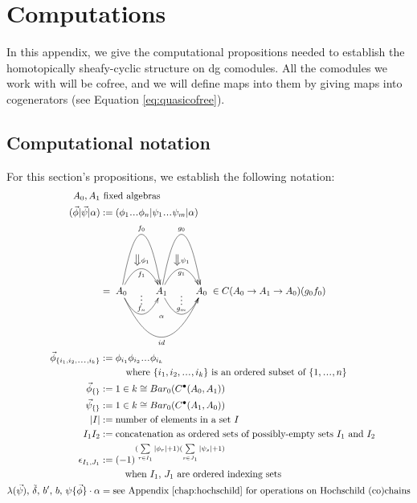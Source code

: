 \chapter{Computations}
In this appendix, we give the 
computational propositions 
needed to establish the 
homotopically sheafy-cyclic structure 
on dg comodules. All the comodules we work 
with will be cofree, 
and we will define maps into them by 
giving maps into cogenerators 
(see Equation \ref{eq:quasicofree}).

\section{Computational notation}
For this section's propositions, we 
establish the following notation:
\begin{align*}
A_0, A_1 
&\textrm{ fixed algebras}\\
(\vec{\phi} | \vec{\psi} | \alpha) 
&:= 
(\phi_1\smdots\phi_n | \psi_1\smdots\psi_m| \alpha)\\
&= 
\xymatrix{
A_0 \ar@/^5pc/[r]^{f_0} 
\ar@/^2pc/[r]^{\big\Downarrow \phi_1}_{f_1} 
\ar@/_2pc/[r]^{\substack{\vdots\\ f_n}}
\ar@/_4pc/[rr]_{id}^{\substack{\alpha \\ \\ \\ \\ }}
& A_1 \ar@/^5pc/[r]^{g_0} 
\ar@/^2pc/[r]^{\big\Downarrow \psi_1}_{g_1} 
\ar@/_2pc/[r]^{\substack{\vdots\\ g_m}}
& A_0
}
\in C(A_0 \to A_1 \to A_0)(g_0f_0)\\
\vec{\phi}_{\{i_1, i_2,\smdots, i_k\}}
&:= 
\phi_{i_1}\phi_{i_2}\smdots\phi_{i_k}\\
&\phantom{{}move{}}
 \textrm{ where $\{i_1, i_2,\smdots, i_k\}$ 
 is an ordered subset of $\{1,\smdots,n\}$}\\
\vec{\phi}_{\{\}}
&:= 
1 \in k \cong Bar_0(C^\bullet(A_0, A_1))\\
\vec{\psi}_{\{\}}
&:= 
1 \in k \cong Bar_0(C^\bullet(A_1, A_0))\\
|I| 
&:=
\textrm{number of elements in a set $I$}\\
I_1I_2 
&:= 
\textrm{concatenation as ordered sets 
of possibly-empty sets $I_1$ and $I_2$}\\
\epsilon_{I_1,J_1} 
&:= 
(-1)^{(\sum \limits_{r \in I_1}|\phi_r|+1)
  (\sum \limits_{s \in J_1}|\psi_s|+1) }\\
&\phantom{{}:={}}  
  \quad \textrm{when $I_1$, $J_1$ are 
  ordered indexing sets}\\
\lambda({\vec{\psi}}),\, \tilde{\delta},\, 
b^\prime,\, b,\, \psi\{\vec{\phi}\}\cdot \alpha
&=
\textrm{see Appendix \ref{chap:hochschild} 
for operations on Hochschild (co)chains}\\
\end{align*}
%
